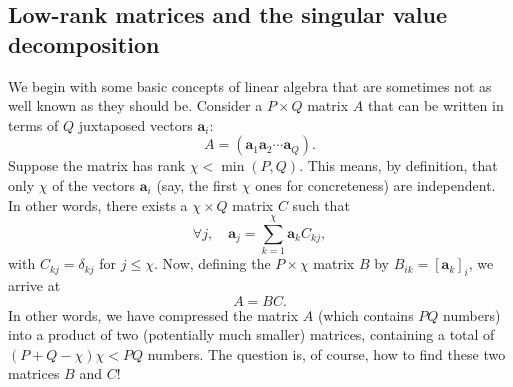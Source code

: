 \documentclass{SciPost}
\begin{document}
\subsection{Low-rank matrices and the singular value decomposition}
We begin with some basic concepts of linear algebra that are sometimes not as well known as they should be.
Consider a $P\times Q$ matrix $A$ that can be written in terms of $Q$ juxtaposed vectors $\mathbf{a}_i$:
\begin{equation}
A = \left(\mathbf{a}_1 \mathbf{a}_2 \cdots \mathbf{a}_Q\right).
\end{equation}
Suppose the matrix has rank $\chi<\min(P,Q)$.
This means, by definition, that only $\chi$ of the vectors $\mathbf{a}_i$ (say, the first $\chi$ ones for concreteness) are independent.
In other words, there exists a $\chi\times Q$ matrix $C$ such that
\begin{equation}
\forall j,\quad \mathbf{a}_j = \sum_{k=1}^\chi \mathbf{a}_k C_{kj},
\end{equation}
with $C_{kj}=\delta_{kj}$ for $j\le\chi$.
Now, defining the $P\times \chi$ matrix $B$ by $B_{ik}=[\mathbf{a}_k]_i$, we arrive at
\begin{equation}
A = BC.
\end{equation}
In other words, we have compressed the matrix $A$ (which contains $PQ$ numbers) into a product of two (potentially much smaller) matrices, containing a total of $(P+Q-\chi)\chi<PQ$ numbers.
The question is, of course, how to find these two matrices $B$ and $C$!
\end{document}
